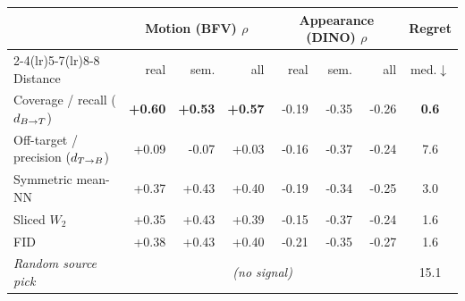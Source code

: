 \begin{tabular}{l rrr rrr c}
\toprule
 & \multicolumn{3}{c}{Motion (BFV) $\rho$} & \multicolumn{3}{c}{Appearance (DINO) $\rho$} & Regret \\
\cmidrule(lr){2-4}\cmidrule(lr){5-7}\cmidrule(lr){8-8}
Distance & real & sem. & all & real & sem. & all & med.$\downarrow$ \\
\midrule
Coverage / recall ($d_{B\to T}$)      & \textbf{+0.60} & \textbf{+0.53} & \textbf{+0.57} & -0.19 & -0.35 & -0.26 & \textbf{0.6} \\
Off-target / precision ($d_{T\to B}$) & +0.09 & -0.07 & +0.03 & -0.16 & -0.37 & -0.24 & 7.6 \\
Symmetric mean-NN               & +0.37 & +0.43 & +0.40 & -0.19 & -0.34 & -0.25 & 3.0 \\
Sliced $W_2$                    & +0.35 & +0.43 & +0.39 & -0.15 & -0.37 & -0.24 & 1.6 \\
FID                             & +0.38 & +0.43 & +0.40 & -0.21 & -0.35 & -0.27 & 1.6 \\
\midrule
\emph{Random source pick}       & \multicolumn{6}{c}{\emph{(no signal)}} & 15.1 \\
\bottomrule
\end{tabular}
